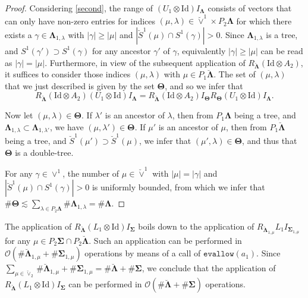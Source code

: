 \documentclass{amsart}
\theoremstyle{definition}
\theoremstyle{remark}
\numberwithin{equation}{section}
\newcommand{\1}{\mathbb 1}
\begin{document}
\begin{proof}
Considering \eqref{second}, the range of $(U_1 \otimes \mathrm{Id}) I_{\bm{\Lambda}}$ consists of vectors that can only have non-zero entries for indices $(\mu,\lambda) \in \breve{\vee}^1 \times P_2\bm{\Lambda}$ for which there exists a $\gamma \in \bm{\Lambda}_{1,\lambda}$ with $|\gamma|\geq |\mu|$ and $|\breve{S}^1(\mu) \cap S^1(\gamma)|>0$.
Since $\bm{\Lambda}_{1,\lambda}$ is a tree, and $S^1(\gamma') \supset S^1(\gamma)$ for any ancestor $\gamma'$ of $\gamma$, 
equivalently $|\gamma|\geq |\mu|$ can be read as $|\gamma|= |\mu|$. Furthermore, in view of the subsequent application of $R_{\bm{\breve{\Lambda}}} (\mathrm{Id} \otimes A_2)$, it suffices to consider 
those indices $(\mu,\lambda)$ with $\mu \in P_1\bm{\breve{\Lambda}}$. 
The set of $(\mu,\lambda)$ that we just described is given by the set $\bm{\Theta}$, and so we infer that
$$
R_{\bm{\breve{\Lambda}}} (\mathrm{Id} \otimes A_2) (U_1 \otimes \mathrm{Id}) I_{\bm{\Lambda}}=R_{\bm{\breve{\Lambda}}} (\mathrm{Id} \otimes A_2) I_{\bm{\Theta}} R_{\bm{\Theta}} (U_1 \otimes \mathrm{Id}) I_{\bm{\Lambda}}.
$$

Now let $(\mu,\lambda) \in \bm{\Theta}$. If $\lambda'$ is an ancestor of $\lambda$, then 
from $P_1 \bm{\Lambda}$ being a tree, and $\bm{\Lambda}_{1,\lambda} \subset \bm{\Lambda}_{1,\lambda'}$, we have $(\mu,\lambda') \in \bm{\Theta}$. If $\mu'$ is an ancestor of $\mu$, then from $P_1 \bm{\breve{\Lambda}}$ being a tree, and $\breve{S}^1(\mu') \supset \breve{S}^1(\mu)$, we infer that $(\mu',\lambda) \in \bm{\Theta}$, and thus that $\bm{\Theta}$ is a double-tree. 

For any $\gamma \in \vee^1$, the number of $\mu \in \breve{\vee}^1$ with $|\mu|=|\gamma|$ and $|\breve{S}^1(\mu) \cap S^1(\gamma)|>0$ is uniformly bounded, 
from which we infer that $\# \bm{\Theta} \lesssim \sum_{\lambda \in P_2 \bm{\Lambda}} \#\bm{\Lambda}_{1,\lambda}=\#\bm{\Lambda}$.
\end{proof}

The application of $R_{\bm{\breve{\Lambda}}} (L_1 \otimes \mathrm{Id}) I_{\bm{\Sigma}}$ boils down to the application of 
$R_{\bm{\breve{\Lambda}}_{1,\mu}} L_1 I_{\bm{\Sigma}_{1,\mu}}$ for any $\mu \in P_2 \bm{\Sigma}\cap P_2\bm{\breve{\Lambda}}$.
Such an application can be performed in ${\mathcal O}(\#\bm{\breve{\Lambda}}_{1,\mu}+\#\bm{\Sigma}_{1,\mu})$ operations by means of a call of $\mathtt{evallow}(a_1)$.
Since
$\sum_{\mu \in \breve{\vee}_2}\#\bm{\breve{\Lambda}}_{1,\mu} + \#\bm{\Sigma}_{1,\mu} = \# \bm{\breve{\Lambda}}+ \# \bm{\Sigma}$,
we conclude that the application of $R_{\bm{\breve{\Lambda}}} (L_1 \otimes \mathrm{Id}) I_{\bm{\Sigma}}$ can be performed in ${\mathcal O}(\#\bm{\breve{\Lambda}}+\#\bm{\Sigma})$ operations.
\end{document}
